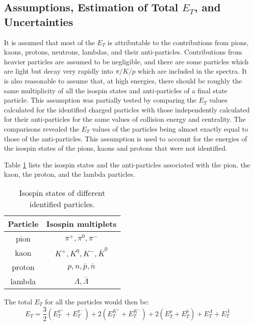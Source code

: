 \subsection{Assumptions, Estimation of Total $E_{T}$, and Uncertainties}\label{totalET}
It is assumed that most of the $E_{T}$ is attributable to the contributions from pions, kaons, protons, neutrons, lambdas, and their anti-particles. Contributions from heavier particles are assumed to be negligible, and there are some particles which are light but decay very rapidly into $\pi/K/p$ which are included in the spectra. It is also reasonable to assume that, at high energies, there should be roughly the same multiplicity of all the isospin states and anti-particles of a final state particle. This assumption was partially tested by comparing the $E_{T}$ values calculated for the identified charged particles with those independently calculated for their anti-particles for the same values of collision energy and centrality. The comparisons revealed the $E_{T}$ values of the particles being almost exactly equal to those of the anti-particles. This assumption is used to account for the energies of the isospin states of the pions, kaons and protons that were not identified.

Table \ref{table:isospinStates} lists the isospin states and the anti-particles associated with the pion, the kaon, the proton, and the lambda particles.
	\begin{table}[!b]
	\centering
	\caption{Isospin states of different identified particles.}
	\begin{tabular}{|c c|}
	\hline
	Particle & Isospin multiplets \\ [0.5ex]
	\hline
	\hline
	pion & $\pi^{+}, \pi^{0}, \pi^{-} $ \\
	kaon & $K^{+}, K^{0}, K^{-}, \bar{K}^{0}$ \\
	proton & $p, n, \bar{p}, \bar{n}$  \\
	lambda & $\Lambda, \bar{\Lambda}$  \\ [1ex]
	\hline
	\end{tabular}
	\label{table:isospinStates}
	\end{table}
	
The total $E_{T}$ for all the particles would then be:	
	\begin{equation}\label{eqn:TotET}
	E_{T} = \frac{3}{2}(E_{T}^{\pi^{+}}+E_{T}^{\pi^{-}}) + 2(E_{T}^{K^{+}}+E_{T}^{K^{-}}) + 2(E_{T}^{p}+E_{T}^{\bar{p}}) + E_{T}^{\Lambda} + E_{T}^{\bar{\Lambda}}
	\end{equation}
	
